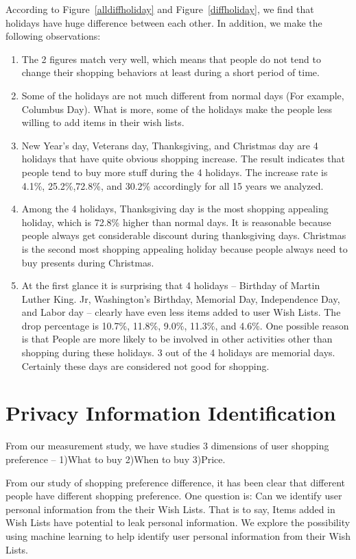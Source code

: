 \documentclass{llncs}
\begin{document}
According to Figure~\ref{alldiffholiday} and Figure~\ref{diffholiday}, we find that holidays have huge difference between each other. In addition, we make the following observations:
\begin{enumerate}
\item The 2 figures match very well, which means that people do not tend to change their shopping behaviors at least during a short period of time. 
\item Some of the holidays are not much different from normal days (For example, Columbus Day). What is more, some of the holidays make the people less willing to add items in their wish lists. 
\item New Year's day, Veterans day, Thanksgiving, and Christmas day are 4 holidays that have quite obvious shopping increase. The result indicates that people tend to buy more stuff during the 4 holidays. The increase rate is 4.1\%, 25.2\%,72.8\%, and 30.2\% accordingly for all 15 years we analyzed. 
\item Among the 4 holidays, Thanksgiving day is the most shopping appealing holiday, which is 72.8\% higher than normal days. It is reasonable because people always get considerable discount during thanksgiving days. Christmas is the second most shopping appealing holiday because people always need to buy presents during Christmas.
\item At the first glance it is surprising that 4 holidays -- Birthday of Martin Luther King. Jr, Washington's Birthday, Memorial Day, Independence Day, and Labor day -- clearly have even less items added to user Wish Lists. The drop percentage is 10.7\%, 11.8\%, 9.0\%, 11.3\%, and 4.6\%. One possible reason is that People are more likely to be involved in other activities other than shopping during these holidays. 3 out of the 4 holidays are memorial days. Certainly these days are considered not good for shopping. 
\end{enumerate}

\section{Privacy Information Identification}

From our measurement study, we have studies 3 dimensions of user shopping preference -- 1)What to buy 2)When to buy 3)Price.

From our study of shopping preference difference, it has been clear that different people have different shopping preference. One question is: Can we identify user personal information from the their Wish Lists. That is to say, Items added in Wish Lists have potential to leak personal information. We explore the possibility using machine learning to help identify user personal information from their Wish Lists.
\end{document}
